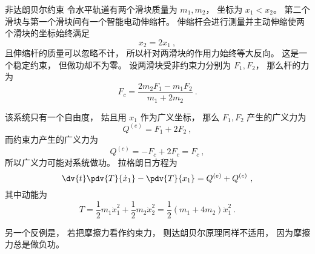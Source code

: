 \begin{example}{非达朗贝尔约束}\label{ex_dAlbt_1}
令水平轨道有两个滑块质量为 $m_1,m_2$， 坐标为 $x_1<x_2$。 第二个滑块与第一个滑块间有一个智能电动伸缩杆。 伸缩杆会进行测量并主动伸缩使两个滑块的坐标始终满足
\begin{equation}
x_2 = 2x_1~,
\end{equation}
且伸缩杆的质量可以忽略不计， 所以杆对两滑块的作用力始终等大反向。 这是一个稳定约束， 但做功却不为零。 设两滑块受非约束力分别为 $F_1,F_2$， 那么杆的力为
\begin{equation}
F_c = \frac{2m_2F_1 - m_1F_2}{m_1+2m_2}~.
\end{equation}

该系统只有一个自由度， 姑且用 $x_1$ 作为广义坐标， 那么 $F_1,F_2$ 产生的广义力为
\begin{equation}
Q^{(e)} = F_1 + 2F_2~,
\end{equation}
而约束力产生的广义力为
\begin{equation}
Q^{(c)} = -F_c + 2F_c = F_c~,
\end{equation}
所以广义力可能对系统做功。 拉格朗日方程为
\begin{equation}
\dv{t}\pdv{T}{\dot x_1} - \pdv{T}{x_1} = Q^{(e)} + Q^{(c)}~,
\end{equation}
其中动能为
\begin{equation}
T = \frac{1}{2}m_1\dot x_1^2 + \frac{1}{2}m_2 \dot x_2^2 = \frac{1}{2}(m_1 + 4m_2)\dot x_1^2~.
\end{equation}
\end{example}
另一个反例是， 若把摩擦力看作约束力， 则达朗贝尔原理同样不适用， 因为摩擦力总是做负功。
